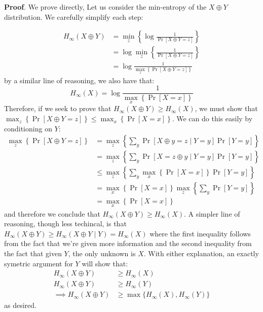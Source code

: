 \documentclass{article}
\begin{document}
\begin{enumerate}[,start=6]
\begin{enumerate}[noitemsep,topsep=\mdcompacttopsep,label=\alph*.]
\begin{mdbmarginx}{1ex}{0pt}{1ex}{0pt}%
\noindent{}\textbf{Proof}.  We prove directly, Let us consider the min-entropy of the $X \oplus Y$ distribution. We carefully
simplify each step:%
\end{mdbmarginx}%
\noindent\noindent\[%
\begin{aligned}
H_{\infty}(X \oplus Y) &= \min_z \left\{\log \frac{1}{\Pr[X \oplus Y = z]} \right\} \\
&= \log \min_z \left\{ \frac{1}{\Pr[X \oplus Y = z]}\right\} \\
&= \log \frac{1}{\max_z \left\{ \Pr[X \oplus Y = z]\right\}}
\end{aligned}
\]%
by a similar line of reasoning, we also have that:
\noindent\noindent\[%
H_{\infty}(X) = \log \frac{1}{\max_x \left\{ \Pr[X = x] \right\}}
\]%
Therefore, if we seek to prove that $H_{\infty}(X \oplus Y) \geq H_{\infty}(X)$, we must show
that $\max_z \left\{ \Pr[X \oplus Y = z]\right\} \leq  \max_x \left\{ \Pr[X = x] \right\}$. We
can do this easily by conditioning on $Y$:
\noindent\noindent\[%
\begin{aligned}
\max_z \left\{ \Pr[X \oplus Y = z]\right\} &= \max_z \left\{ \sum_y \Pr[X \oplus y = z \mid Y=y]\Pr[Y = y]\right\} \\
&= \max_z \left\{ \sum_y \Pr[X = z \oplus y \mid Y=y]\Pr[Y = y]\right\} \\
&\leq \max_z \left\{ \sum_y  \max_x \left\{ \Pr[X = x] \right\} \Pr[Y = y]\right\} \\
&= \max_x \left\{ \Pr[X = x] \right\} \max_z \left\{ \sum_y \Pr[Y = y]\right\} \\
&= \max_x \left\{ \Pr[X = x] \right\}
\end{aligned} 
\]%
and therefore we conclude that $H_{\infty}(X \oplus Y) \geq H_{\infty}(X)$. A simpler line of 
reasoning, though less techincal, is that $H_{\infty}(X \oplus Y) \geq H_{\infty}(X \oplus Y \mid Y) = H_{\infty}(X)$
where the first inequality follows from the fact that we're given more information and the second
inequality from the fact that given $Y$, the only unknown is $X$. With either explanation,
an exactly symetric argument for $Y$ will show that:
\noindent\noindent\[%
\begin{aligned}
H_{\infty}(X \oplus Y) &\geq H_{\infty}(X) \\
H_{\infty}(X \oplus Y) &\geq H_{\infty}(Y) \\
\implies H_{\infty}(X \oplus Y) &\geq \max \{ H_{\infty}(X), H_{\infty}(Y)\}
\end{aligned}
\]%
as desired.%


\end{enumerate}
\end{enumerate}
\end{document}
